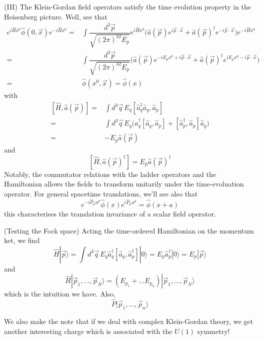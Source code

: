 \begin{rmk}
(III) The Klein-Gordan field operators satisfy the time evolution property in the Heisenberg picture. Well, see that
\[\begin{align*}
e^{i\hat{H}x^{0}}\hat{\phi }(0,\vec{x})e^{-i\hat{H}x^{0}}=&\int \dfrac{d^3\vec{p}}{\sqrt{(2\pi )^32E_{p}}}e^{i\hat{H}x^{0}}\Big(\hat{a}(\vec{p})e^{i\vec{p}\cdot \vec{x}}+\hat{a}(\vec{p})^{\dagger}e^{-i\vec{p}\cdot \vec{x}}\Big)e^{-i\hat{H}x^{0}} \\
=&\int \dfrac{d^3\vec{p}}{\sqrt{(2\pi )^32E_{p}}}\Big(\hat{a}(\vec{p})e^{-iE_{p}x^{0}+i\vec{p}\cdot \vec{x}}+\hat{a}(\vec{p})^{\dagger}e^{iE_{p}x^{0}-i\vec{p}\cdot \vec{x}}\Big)\\
=&\hat{\phi }(x^{0},\vec{x})=\hat{\phi }(x)
\end{align*}\]
with
\[\begin{align*}
[\hat{H},\hat{a}(\vec{p})]=&\int d^3\vec{q}\,E_{q}[\hat{a}_{q}^{\dagger}\hat{a}_{q},\hat{a}_{p}]\\
=&\int d^3\vec{q}\,E_{q}\Big(\hat{a}^{\dagger}_{q}[\hat{a}_{q},\hat{a}_{p}]+[\hat{a}_{p}^{\dagger},\hat{a}_{p}]\hat{a}_{q}\Big)\\
=&-E_{p}\hat{a}(\vec{p})
\end{align*}\]
and
\[[\hat{H},\hat{a}(\vec{p})^{\dagger}]=E_{p}\hat{a}(\vec{p})^{\dagger}\]
Notably, the commutator relations with the ladder operators and the Hamiltonian allows the fields to transform unitarily under the time-evoluation operator. For general spacetime translations, we'll see also that
\[e^{-i\hat{P}_{\mu }a^{\mu }}\hat{\phi }(x)e^{i\hat{P}_{\mu }a^{\mu }}=\hat{\phi }(x+a)\]
this characterises the translation invariance of a scalar field operator.
\end{rmk}
\vspace{2ex}
\begin{rmk}
(Testing the Fock space) Acting the time-ordered Hamiltonian on the momentum ket, we find
\[\hat{H}|\vec{p}\rangle =\int d^3\vec{q}\,E_{q}\hat{a}_{q}^{\dagger}[\hat{a}_{q},\hat{a}_{p}^{\dagger}]|0\rangle=E_{p}\hat{a}_{p}^{\dagger}|0\rangle =E_{p}|\vec{p}\rangle  \]
and
\[\hat{H}|\vec{p}_{1},\ldots ,\vec{p}_{N}\rangle =(E_{p_1}+\ldots E_{p_{n}})|\vec{p}_{1},\ldots ,\vec{p}_{N}\rangle \]
which is the intuition we have. Also,
\[\hat{P}|\vec{p}_{1},\ldots ,\vec{p}_{n}\rangle \]
\end{rmk}
We also make the note that if we deal with complex Klein-Gordan theory, we get another interesting charge which is associated with the $U(1)$ symmetry!
\vspace{2ex}

